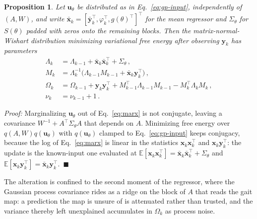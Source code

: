 \documentclass[letterpaper, 10 pt, conference]{ieeeconf}  %
\newtheorem{proposition}{Proposition}
\newcommand{\E}{\mathbb{E}}
\begin{document}
\begin{proposition} \label{prop:mnw}
Let $\mathbf{u}_{\theta}$ be distributed as in Eq.~\ref{eq:gp-input}, independently of $(A, W)$, and write $\bar{\mathbf{x}}_k = [\bar{\mathbf{y}}_k^\top, \varphi_k^\top, g(\theta)^\top]^\top$ for the mean regressor and $\Sigma_{\theta}$ for $S(\theta)$ padded with zeros onto the remaining blocks. Then the matrix-normal-Wishart distribution minimizing variational free energy after observing $\mathbf{y}_k$ has parameters
\begin{align} \label{eq:mnw-update}
    \Lambda_k &= \Lambda_{k-1} + \bar{\mathbf{x}}_k \bar{\mathbf{x}}_k^\top + \Sigma_{\theta} \, , \nonumber \\
    M_k &= \Lambda_k^{-1}\big(\Lambda_{k-1} M_{k-1} + \bar{\mathbf{x}}_k \mathbf{y}_k^\top \big) \, , \nonumber \\
    \Omega_k &= \Omega_{k-1} + \mathbf{y}_k \mathbf{y}_k^\top + M_{k-1}^\top \Lambda_{k-1} M_{k-1} - M_k^\top \Lambda_k M_k \, , \nonumber \\
    \nu_k &= \nu_{k-1} + 1 \, .
\end{align}
\end{proposition}
\emph{Proof:} Marginalizing $\mathbf{u}_{\theta}$ out of Eq.~\ref{eq:marx} is not conjugate, leaving a covariance $W^{-1} + A^\top \Sigma_{\theta} A$ that depends on $A$. Minimizing free energy over $q(A,W)q(\mathbf{u}_{\theta})$ with $q(\mathbf{u}_{\theta})$ clamped to Eq.~\ref{eq:gp-input} keeps conjugacy, because the log of Eq.~\ref{eq:marx} is linear in the statistics $\mathbf{x}_k\mathbf{x}_k^\top$ and $\mathbf{x}_k\mathbf{y}_k^\top$: the update is the known-input one evaluated at $\E[\mathbf{x}_k\mathbf{x}_k^\top] = \bar{\mathbf{x}}_k \bar{\mathbf{x}}_k^\top + \Sigma_{\theta}$ and $\E[\mathbf{x}_k\mathbf{y}_k^\top] = \bar{\mathbf{x}}_k \mathbf{y}_k^\top$.~$\blacksquare$

The alteration is confined to the second moment of the regressor, where the Gaussian process covariance rides as a ridge on the block of $A$ that reads the gait map: a prediction the map is unsure of is attenuated rather than trusted, and the variance thereby left unexplained accumulates in $\Omega_k$ as process noise.
\end{document}
